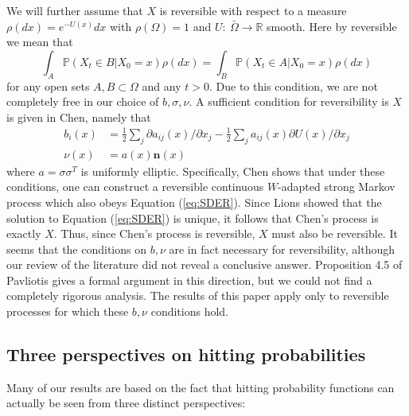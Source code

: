 \documentclass[english, aip, jcp, priprint, graphicx,floatfix]{revtex4-1}
\theoremstyle{plain}
\theoremstyle{definition}
\theoremstyle{plain}
\begin{document}
We will further assume that $X$ is reversible with respect to a measure $\rho(dx)=e^{-U(x)}dx$ with $\rho(\Omega)=1$ and $U:\ \bar \Omega \rightarrow \mathbb{R}$ smooth.  Here by reversible we mean that
\[
\int_{A}\mathbb{P}(X_{t}\in B|X_{0}=x)\rho(dx)  =\int_{B}\mathbb{P}(X_{t}\in A|X_{0}=x)\rho(dx)
\]
for any open sets $A,B\subset \Omega$ and any $t>0$.  Due to this condition, we are not completely free in our choice of $b,\sigma,\nu$.  A sufficient condition for reversibility is $X$ is given in Chen,\cite{chen1993reflecting} namely that
\begin{align*}
b_i(x)&=\frac{1}{2} \sum_j \partial a_{ij}(x)/\partial x_j - \frac{1}{2}\sum_j a_{ij}(x) \partial U(x)/\partial x_j \\
\nu(x)&= a(x) \mathbf{n}(x)
\end{align*}
where $a=\sigma\sigma^T$ is uniformly elliptic.  Specifically, Chen shows that under these conditions, one can construct a reversible continuous $W$-adapted strong Markov process which also obeys Equation (\ref{eq:SDER}).  Since Lions\cite{lions1984stochastic} showed that the solution to Equation (\ref{eq:SDER}) is unique, it follows that Chen's process is exactly $X$.  Thus, since Chen's process is reversible, $X$ must also be reversible.  It seems that the conditions on $b,\nu$ are in fact necessary for reversibility, although our review of the literature did not reveal a conclusive answer.  Proposition 4.5 of Pavliotis\cite{Pavliotis2016-xn} gives a formal argument in this direction, but we could not find a completely rigorous analysis.  The results of this paper apply only to reversible processes for which these $b,\nu$ conditions hold.

\subsection{Three perspectives on hitting probabilities}

Many of our results are based on the fact that hitting probability functions can actually be seen from three distinct perspectives:
\end{document}
